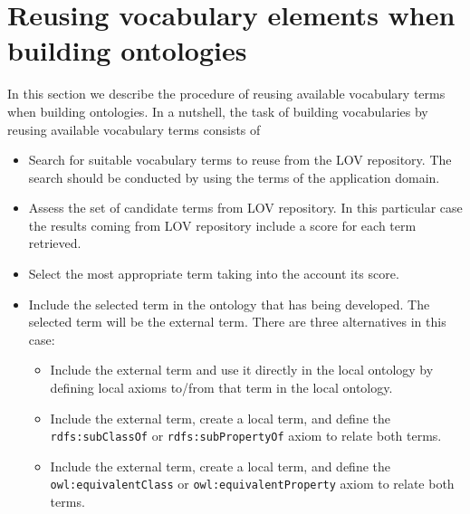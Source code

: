 
\vspace{-3mm}
\section{Reusing vocabulary elements when building ontologies}\label{sec:reuse}
In this section we describe the procedure of reusing available vocabulary terms when building ontologies. In a nutshell, the task of building vocabularies by reusing available vocabulary terms consists of
\vspace{-1mm}
\begin{itemize}
	\item Search for suitable vocabulary terms to reuse from the LOV repository. The search should be conducted by using the terms of the application domain.
	\item Assess the set of candidate terms from LOV repository. In this particular case the results coming from LOV repository include a score for each term retrieved.
	\item Select the most appropriate term taking into the account its score.
	\item Include the selected term in the ontology that has being developed. The selected term will be the external term. There are three alternatives in this case: 
	\begin{itemize}
		\item Include the external term and use it directly in the local ontology by defining local axioms to/from that term in the local ontology.
		\item Include the external term, create a local term, and define the {\tt rdfs:subClassOf} or {\tt rdfs:subPropertyOf} axiom to relate both terms.
		\item Include the external term, create a local term, and define the {\tt owl:equivalentClass} or {\tt owl:equivalentProperty} axiom to relate both terms. 				
	\end{itemize}
\end{itemize}


